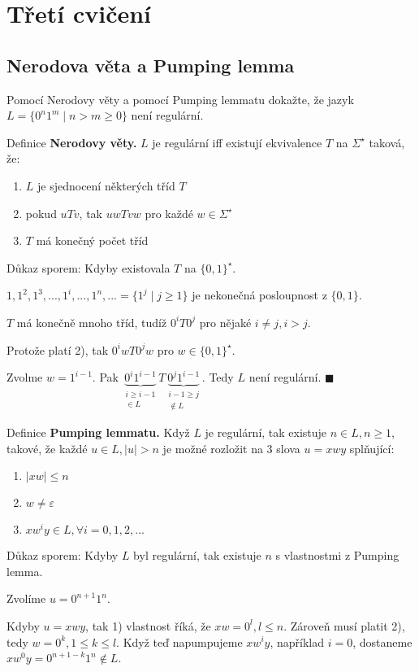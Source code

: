 \section{Třetí cvičení}

\subsection{Nerodova věta a Pumping lemma}
Pomocí Nerodovy věty a pomocí Pumping lemmatu dokažte, že jazyk $L = \{0^n 1^m \mid n > m \geq 0\}$ není regulární.

Definice \textbf{Nerodovy věty.} $L$ je regulární iff existují ekvivalence $T$ na $\Sigma^\star$ taková, že:
\begin{enumerate}[1), noitemsep]
    \item $L$ je sjednocení některých tříd $T$
    \item pokud $uTv$, tak $uwTvw$ pro každé $w \in \Sigma^\star$
    \item $T$ má konečný počet tříd
\end{enumerate}
Důkaz sporem:
Kdyby existovala $T$ na $\{0,1\}^\star$.

$1, 1^2, 1^3, ..., 1^i, ..., 1^n, ... = \{1^j \mid j \geq 1\}$ je nekonečná posloupnost z $\{0,1\}$.

$T$ má konečně mnoho tříd, tudíž $0^i T 0^j$ pro nějaké $i \not= j, i>j$.

Protože platí 2), tak $0^i w T 0^j w$ pro $w \in \{0,1\}^\star$.

Zvolme $w = 1^{i-1}$. Pak $\underbrace{0^i 1^{i-1}}_{\substack{i \geq i-1 \\ \in L}} T 
\underbrace{0^j 1^{i-1}}_{\substack{i-1 \geq j  \\\not\in L }}$. Tedy $L$ není regulární. $\blacksquare$

Definice \textbf{Pumping lemmatu.} Když $L$ je regulární, tak existuje $n \in L, n \geq 1$, takové, že každé ${u \in L},
|u| > n$ je 
možné rozložit na 3 slova $u = xwy$ splňující:
\begin{enumerate}[1), noitemsep]
    \item $|xw| \leq n$
    \item $w \not= \varepsilon$
    \item $xw^i y \in L, \forall i = 0, 1, 2, ...$
\end{enumerate}
Důkaz sporem:
Kdyby $L$ byl regulární, tak existuje $n$ s vlastnostmi z Pumping lemma.

Zvolíme $u = 0^{n+1} 1^n$.

Kdyby $u = xwy$, tak 1) vlastnost říká, že $xw = 0^l, l \leq n$. Zároveň musí platit 2), tedy $w = 0^k, 1 \leq k \leq l$.
Když teď napumpujeme $xw^i y$, například $i=0$, dostaneme $xw^0 y = 0^{n+1-k} 1^{n} \not\in L$.

